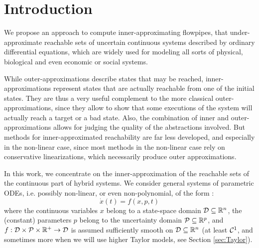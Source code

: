 \documentclass{sig-alternate-05-2015}
\def\R{{\mathbb R}}
\begin{document}
%
%

%
%

%
%





\section{Introduction}

We propose an approach to compute inner-approxi\-mating flowpipes, that under-approximate reachable sets 
of uncertain continuous systems described by ordinary differential equations, which 
are widely used for modeling all sorts of physical, biological and even economic or
social systems.  

While outer-approximations describe states that may be rea\-ched, inner-approximations represent
states that are actually reachable from one of the initial states. They are
thus a very useful complement to the more classical outer-approxima\-tions, since they allow to show
that some executions of the system will actually reach a target or a bad state. Also, the combination of
inner and outer-approximations allows for judging the quality of the abstractions involved. 
But methods for inner-approximated reachability are far less developed, and especially in the non-linear case, 
since most methods in the non-linear case rely on conservative linearizations, which necessarily produce outer approximations.

In this work, we concentrate on the inner-approximation of the reachable sets of
the continuous part of hybrid systems. %
We consider general systems of parametric ODEs, i.e. possibly non-linear, or
even non-polyno\-mial, of the form : 
\begin{equation}
\dot{x}(t) = f(x,p,t)
\label{eq:flow}
\end{equation}
\noindent where the continuous variables $x$ belong to a state-space domain 
${\cal D} \subseteq \R^n$, the (constant) parameters $p$ belong to the uncertainty domain
${\cal P} \subseteq \R^p$, and 
$f: {\cal D} \times {\cal P} \times \R^+ \rightarrow {\cal D}$ is assumed sufficiently smooth 
on ${\cal D} \subseteq \R^n$ (at least ${\cal C}^1$, and sometimes more when we will use higher
Taylor models, see Section \ref{sec:Taylor}).
\end{document}
